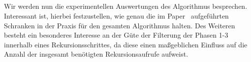 \subsection{\Rm}		%
\noindent
Wir werden nun die experimentellen Auswertungen des Algorithmus \Rm besprechen. Interessant ist, hierbei festzustellen, wie genau die im Paper~\cite{meyer1} aufgeführten Schranken in der Praxis für den gesamten Algorithmus halten. Des Weiteren besteht ein besonderes Interesse an der Güte der Filterung der Phasen 1-3 innerhalb eines Rekursionsschrittes, da diese einen maßgeblichen Einfluss auf die Anzahl der insgesamt benötigten Rekursionsaufrufe aufweist.\\[.1cm]

